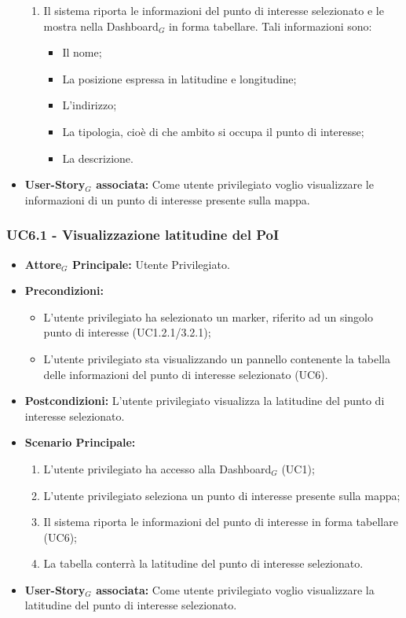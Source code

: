 \documentclass[11pt]{article}
\begin{document}
\begin{justify}
\begin{itemize}
\begin{enumerate}
            \item Il sistema riporta le informazioni del punto di interesse selezionato e le mostra nella Dashboard$_G$ in forma tabellare. Tali informazioni sono:
       \begin{itemize}
       \item Il nome;
       \item La posizione espressa in latitudine e longitudine;
       \item L'indirizzo;
       \item La tipologia, cioè di che ambito si occupa il punto di interesse;
       \item La descrizione.
       \end{itemize}
        \end{enumerate}
     \item \textbf{User-Story$_G$ associata:} Come utente privilegiato voglio visualizzare le informazioni di un punto di interesse presente sulla mappa. 
 \end{itemize}
 \subsubsection{\textbf{UC6.1 - Visualizzazione latitudine del PoI}}
 \begin{itemize}
     \item \textbf{Attore$_G$ Principale:} Utente Privilegiato.
     \item \textbf{Precondizioni:}
       \begin{itemize}
    	        \item L'utente privilegiato ha selezionato un marker, riferito ad un singolo punto di interesse (UC1.2.1/3.2.1);
          \item L'utente privilegiato sta visualizzando un pannello contenente la tabella delle informazioni del punto di interesse selezionato (UC6).
       \end{itemize}
     \item \textbf{Postcondizioni:} L'utente privilegiato visualizza la latitudine del punto di interesse selezionato.
     \item \textbf{Scenario Principale:}
        \begin{enumerate}
            \item L'utente privilegiato ha accesso alla Dashboard$_G$ (UC1);
            \item L'utente privilegiato seleziona un punto di interesse presente sulla mappa;
            \item Il sistema riporta le informazioni del punto di interesse in forma tabellare (UC6);
            \item La tabella conterrà la latitudine del punto di interesse selezionato.
        \end{enumerate}
     \item \textbf{User-Story$_G$ associata:} Come utente privilegiato voglio visualizzare la latitudine del punto di interesse selezionato. 
 \end{itemize}

\end{justify}
\end{document}
